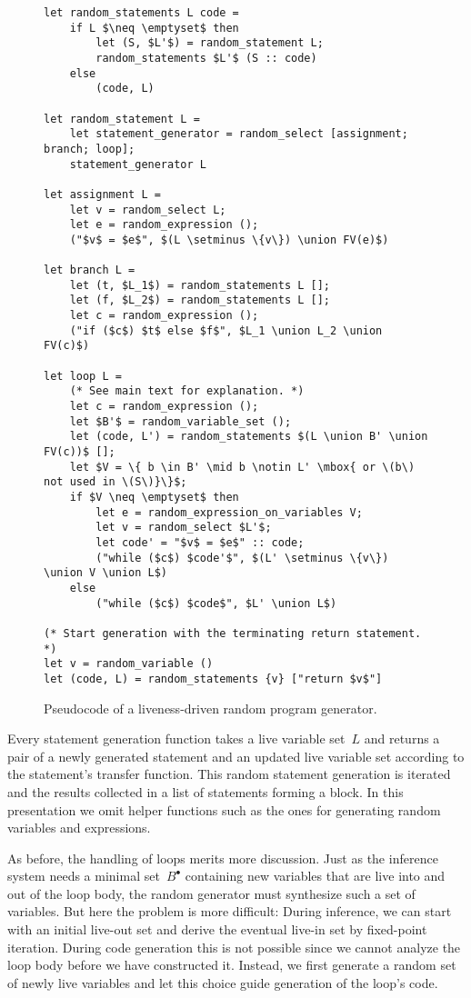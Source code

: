 \documentclass{llncs}
\newcommand{\livein}[1]{\ensuremath{#1^{\bullet}}}
\def\union{\cup}
\begin{document}
\begin{figure}
\begin{lstlisting}
let random_statements L code =
    if L $\neq \emptyset$ then
        let (S, $L'$) = random_statement L;
        random_statements $L'$ (S :: code)
    else
        (code, L)

let random_statement L =
    let statement_generator = random_select [assignment; branch; loop];
    statement_generator L

let assignment L =
    let v = random_select L;
    let e = random_expression ();
    ("$v$ = $e$", $(L \setminus \{v\}) \union FV(e)$)

let branch L =
    let (t, $L_1$) = random_statements L [];
    let (f, $L_2$) = random_statements L [];
    let c = random_expression ();
    ("if ($c$) $t$ else $f$", $L_1 \union L_2 \union FV(c)$)

let loop L =
    (* See main text for explanation. *)
    let c = random_expression ();
    let $B'$ = random_variable_set ();
    let (code, L') = random_statements $(L \union B' \union FV(c))$ [];
    let $V = \{ b \in B' \mid b \notin L' \mbox{ or \(b\) not used in \(S\)}\}$;
    if $V \neq \emptyset$ then
        let e = random_expression_on_variables V;
        let v = random_select $L'$;
        let code' = "$v$ = $e$" :: code;
        ("while ($c$) $code'$", $(L' \setminus \{v\}) \union V \union L$)
    else
        ("while ($c$) $code$", $L' \union L$)

(* Start generation with the terminating return statement. *)
let v = random_variable ()
let (code, L) = random_statements {v} ["return $v$"]
\end{lstlisting}
\caption{Pseudocode of a liveness-driven random program generator.}
\label{fig:generator}
\end{figure}

Every statement generation function takes a live variable set~\(L\) and
returns a pair of a newly generated statement and an updated live variable
set according to the statement's transfer function. This random statement
generation is iterated and the results collected in a list of statements
forming a block. In this presentation we omit helper functions such as the
ones for generating random variables and expressions.

As before, the handling of loops merits more discussion. Just as the
inference system needs a minimal set~\(\livein{B}\) containing new variables
that are live into and out of the loop body, the random generator must
synthesize such a set of variables. But here the problem is more difficult:
During inference, we can start with an initial live-out set and derive the
eventual live-in set by fixed-point iteration. During code generation this
is not possible since we cannot analyze the loop body before we have
constructed it. Instead, we first generate a random set of newly live
variables and let this choice guide generation of the loop's code.
\end{document}
